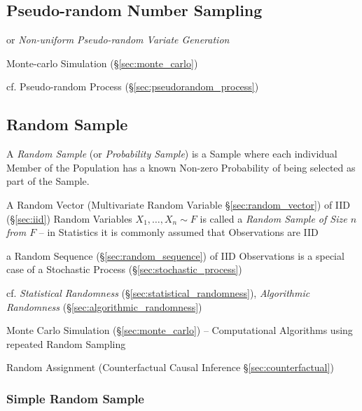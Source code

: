 \subsection{Pseudo-random Number Sampling}\label{sec:pseudorandom_sampling}

or \emph{Non-uniform Pseudo-random Variate Generation}

Monte-carlo Simulation (\S\ref{sec:monte_carlo})

cf. Pseudo-random Process (\S\ref{sec:pseudorandom_process})



\subsection{Random Sample}\label{sec:random_sample}

A \emph{Random Sample} (or \emph{Probability Sample}) is a Sample where each
individual Member of the Population has a known Non-zero Probability of being
selected as part of the Sample.

A Random Vector (Multivariate Random Variable \S\ref{sec:random_vector}) of IID
(\S\ref{sec:iid}) Random Variables $X_1, \ldots, X_n \sim F$ is called a
\emph{Random Sample of Size $n$ from $F$} -- in Statistics it is commonly
assumed that Observations are IID

 a Random Sequence (\S\ref{sec:random_sequence}) of IID Observations is a
 special case of a Stochastic Process (\S\ref{sec:stochastic_process})

\fist cf. \emph{Statistical Randomness} (\S\ref{sec:statistical_randomness}),
\emph{Algorithmic Randomness} (\S\ref{sec:algorithmic_randomness})

\fist Monte Carlo Simulation (\S\ref{sec:monte_carlo}) -- Computational
Algorithms using repeated Random Sampling

\fist Random Assignment (Counterfactual Causal Inference
\S\ref{sec:counterfactual})



\subsubsection{Simple Random Sample}\label{sec:simple_random_sample}

